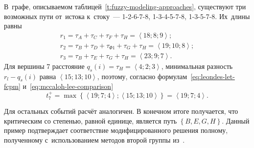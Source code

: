 В~графе, описываемом таблицей~\ref{t:fuzzy-modeling-approaches}, существуют три возможных пути от~истока к~стоку~--- 1-2-6-7-8, 1-3-4-5-7-8, 1-3-5-7-8. Их~длины равны
\begin{gather*}
  r_1 = \tau_A+\tau_C+\tau_F+\tau_H = \left \langle 18; 8; 9 \right \rangle; \\
  r_2 = \tau_B+\tau_D+\tau_{\Phi 1}+\tau_G+\tau_H = \left \langle 19; 10; 8 \right \rangle; \\
  r_3 = \tau_B+\tau_E+\tau_G+\tau_H = \left \langle 23; 9; 7 \right \rangle.
\end{gather*}
Для вершины 7 расстояние $q_s\left(i\right) = \tau_H = \left \langle 4;2;3  \right \rangle$, минимальная разность $r_l - q_s\left(i \right)$ равна $\left \langle 15; 13; 10 \right \rangle$, поэтому, согласно формулам~\eqref{eq:leondes-let-fcpm} и~\eqref{eq:mccaloh-lee-comparison}
\begin{equation*}
  t_7^{+}=\max \left\{ \left \langle 19;7;4 \right \rangle; \left \langle 15;13;10 \right \rangle \right\} = \left \langle 19;7;4 \right \rangle.
\end{equation*}

Для остальных событий расчёт аналогичен. В конечном итоге получается, что критическим со степенью, равной единице, является путь $\left\{B, E, G, H \right\}$. Данный пример подтверждает соответствие модифицированного решения полному, полученному с~использованием методов второй группы из~\cite{Leondes, Dubois_Prade, McCahon_Lee}.